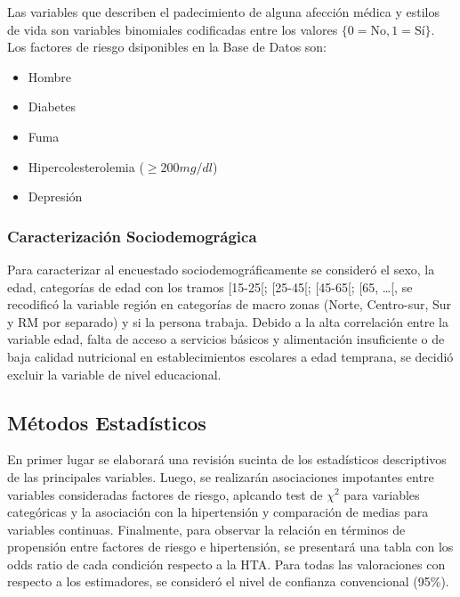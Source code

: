 \documentclass{aa}
\begin{document}
Las variables que describen el padecimiento de alguna afección médica y estilos de vida son variables binomiales codificadas entre los valores $\{0 = \textrm{No}, 1 = \textrm{Sí} \}$. Los factores de riesgo dsiponibles en la Base de Datos son:

\begin{itemize}
    \item Hombre
    \item Diabetes
    \item Fuma
    \item Hipercolesterolemia ($\geq 200 \textit{mg/dl} $)
    \item Depresión
\end{itemize}
 
\subsubsection{Caracterización Sociodemográgica}

Para caracterizar al encuestado sociodemográficamente se consideró el sexo, la edad, categorías de edad con los tramos [15-25[; [25-45[; [45-65[; [65, \dots [, se recodificó la variable región en categorías de macro zonas (Norte, Centro-sur, Sur y RM por separado) y si la persona trabaja. Debido a la alta correlación entre la variable edad, falta de acceso a servicios básicos y alimentación insuficiente o de baja calidad nutricional en establecimientos escolares a edad temprana, se decidió excluir la variable de nivel educacional.

\subsection{Métodos Estadísticos}

En primer lugar se elaborará una revisión sucinta de los estadísticos descriptivos de las principales variables. Luego, se realizarán asociaciones impotantes entre variables consideradas factores de riesgo, aplcando test de $\chi^2$ para variables categóricas y la asociación con la hipertensión y comparación de medias para variables continuas. Finalmente, para observar la relación en términos de propensión entre factores de riesgo e hipertensión, se presentará una tabla con los odds ratio de cada condición respecto a la HTA. Para todas las valoraciones con respecto a los estimadores, se consideró el nivel de confianza convencional (95\%).
\end{document}
